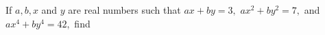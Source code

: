 If $a, b, x$ and $y$ are real numbers such that $ax + by = 3,$ $ax^2+by^2=7,$  and $ax^4+by^4=42,$ find 